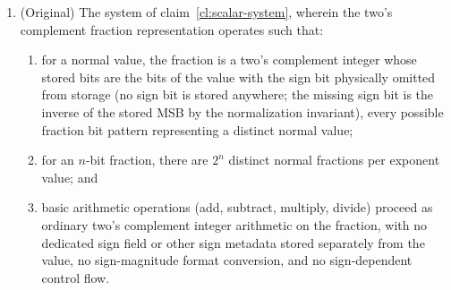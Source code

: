 \documentclass[12pt,letter]{article}
\begin{document}
\begin{enumerate}
\begin{enumerate}
\begin{enumerate}
\begin{enumerate}
                            \item zero represented by a uniform all-zeros fraction;
                            \item infinity represented by a uniform all-ones fraction; and
                            \item undefined states with a non-uniform leading same bit count of 3 or more, encoding the specific cause of the undefined result;
                        \end{enumerate}
                  \item performs basic arithmetic operations (add, subtract, multiply, divide) as ordinary two's complement integer arithmetic on the fractions, with no sign metadata stored with the value, no sign-magnitude format conversion, and no sign-dependent control flow;
                  \item transitions results to the appropriate non-normal state when overflow or underflow occurs rather than truncating to infinity or zero.
              \end{enumerate}
    \end{enumerate}

    \item (Original) The system of claim~\ref{cl:scalar-system}, wherein the two's complement fraction representation operates such that:
          \begin{enumerate}
              \item for a normal value, the fraction is a two's complement integer whose stored bits are the bits of the value with the sign bit physically omitted from storage (no sign bit is stored anywhere; the missing sign bit is the inverse of the stored MSB by the normalization invariant), every possible fraction bit pattern representing a distinct normal value;
              \item for an $n$-bit fraction, there are $2^n$ distinct normal fractions per exponent value; and
              \item basic arithmetic operations (add, subtract, multiply, divide) proceed as ordinary two's complement integer arithmetic on the fraction, with no dedicated sign field or other sign metadata stored separately from the value, no sign-magnitude format conversion, and no sign-dependent control flow.
          \end{enumerate}


\end{enumerate}
\end{document}
